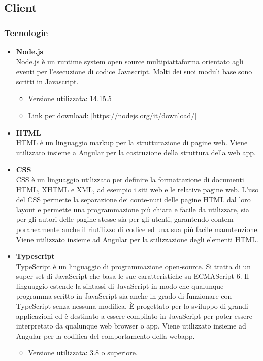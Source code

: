 \subsection{Client}

\subsubsection{Tecnologie}

\begin{itemize}
	\item \textbf{Node.js} \\
	Node.js è un runtime system open source multipiattaforma orientato agli eventi per l'esecuzione di codice Javascript. Molti dei suoi moduli base sono scritti in Javascript. 
	\begin{itemize}
		\item Versione utilizzata: 14.15.5
		\item Link per download: \ref{https://nodejs.org/it/download/}
	\end{itemize}
	
	\item \textbf{HTML} \\
	HTML è un linguaggio markup per la strutturazione di pagine web. Viene utilizzato insieme a Angular per la costruzione della struttura della web app.

	\item \textbf{CSS} \\
	CSS è un linguaggio utilizzato per definire la formattazione di documenti HTML, XHTML e XML, ad esempio i siti web e le relative pagine web. L'uso del CSS permette la separazione dei conte-nuti delle pagine HTML dal loro layout e permette una programmazione più chiara e facile da utilizzare, sia per gli autori delle pagine stesse sia per gli utenti, garantendo contem-poraneamente anche il riutilizzo di codice ed una sua più facile manutenzione. Viene utilizzato insieme ad Angular per la stilizzazione degli elementi HTML.
	\item \textbf{Typescript}\\
	TypeScript è un linguaggio di programmazione open-source. Si tratta di un super-set di JavaScript che basa le sue caratteristiche su ECMAScript 6. Il linguaggio estende la sintassi di JavaScript in modo che qualunque programma scritto in JavaScript sia anche in grado di funzionare con TypeScript senza nessuna modifica. È progettato per lo sviluppo di grandi applicazioni ed è destinato a essere compilato in JavaScript per poter essere interpretato da qualunque web browser o app. Viene utilizzato insieme ad Angular per la codifica del comportamento della webapp.
	\begin{itemize}
		\item Versione utilizzata: 3.8 o superiore.
	\end{itemize}

\end{itemize}

